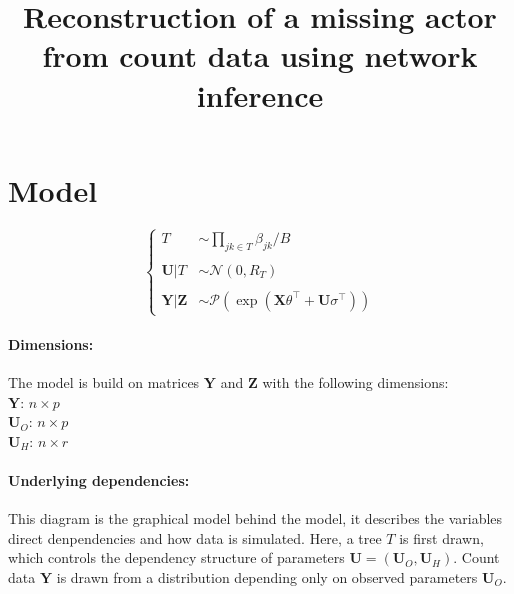 \documentclass[11pt,a4paper]{article}
\title{Reconstruction of a missing actor from count data using network inference}
\newcommand{\Xbf}{\boldsymbol{X}}
\newcommand{\Ybf}{\boldsymbol{Y}}
\newcommand{\Zbf}{\boldsymbol{Z}}
\newcommand{\Ubf}{\boldsymbol{U}}
\newcommand{\edgeunit}{1.5}
\begin{document}
\maketitle
\vspace{3cm}
\tableofcontents
\newpage
\section{Model}

$$\left\{\begin{array}{rl}
T & \sim\prod_{jk \in T} \beta_{jk}/B \\\\
\Ubf |T& \sim\mathcal{N}(0,R_T)\\\\
\Ybf|\Zbf&\sim\mathcal{P}( \exp( \Xbf\theta^\intercal + \Ubf\sigma^\intercal) )
\end{array} \right.$$

\paragraph{Dimensions:}
The model is build on matrices $\Ybf$ and $\Zbf$ with the following dimensions:\\
$\Ybf$: $n\times p$\\
$\Ubf_O$: $n\times p$\\
$\Ubf_H$: $n\times r$


\paragraph{Underlying dependencies:} This diagram is the graphical model behind the model, it describes the variables direct denpendencies and how data is simulated. Here, a tree $T$ is first drawn, which controls the dependency structure of parameters $\Ubf = (\Ubf_O,\Ubf_H)$. Count data $\Ybf$ is drawn from a distribution depending only on observed parameters $\Ubf_O$.
\begin{center}
\end{center}
\end{document}
